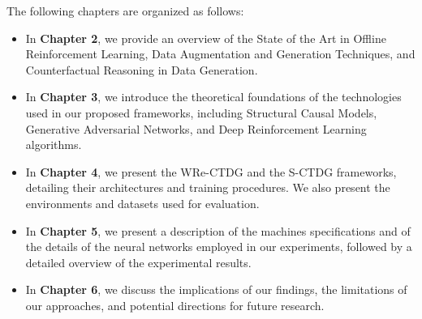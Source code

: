 The following chapters are organized as follows:
\begin{itemize}
    \item In \textbf{Chapter 2}, we provide an overview of the State of the Art
    in Offline Reinforcement Learning, Data Augmentation and Generation Techniques,
    and Counterfactual Reasoning in Data Generation.
    \item In \textbf{Chapter 3}, we introduce the theoretical foundations
    of the technologies used in our proposed frameworks,
    including Structural Causal Models,
    Generative Adversarial Networks,
    and Deep Reinforcement Learning algorithms.
    \item In \textbf{Chapter 4}, we present the WRe-CTDG
    and the S-CTDG frameworks,
    detailing their architectures and training procedures.
    We also present the environments and datasets used for evaluation.
    \item In \textbf{Chapter 5}, we present a description
    of the machines specifications
    and of the details of the neural networks employed in our experiments,
    followed by a detailed overview of the experimental results.
    \item In \textbf{Chapter 6}, we discuss the implications of our findings,
    the limitations of our approaches,
    and potential directions for future research.
\end{itemize}